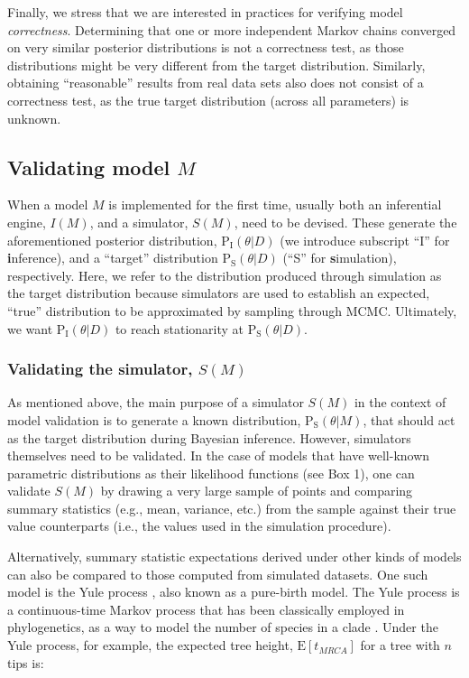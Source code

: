 \documentclass[oneside]{article}
\begin{document}
Finally, we stress that we are interested in practices for verifying model
\emph{correctness}.
Determining that one or more independent Markov chains converged on very
similar posterior distributions is not a correctness test, as those
distributions might be very different from the target distribution.
Similarly, obtaining ``reasonable'' results from real data sets also
does not consist of a correctness test, as the true target
distribution (across all parameters) is unknown.

\subsection*{Validating model $M$}

When a model $M$ is implemented for the first time, usually both an
inferential engine, $I(M)$, and a simulator, $S(M)$, need to be devised.
These generate the aforementioned posterior distribution,
$\text{P}_{\text{I}}(\theta|D)$ (we introduce subscript ``I'' for
\textbf{i}nference), and a ``target'' distribution $\text{P}_{\text{S}}(\theta|D)$ (``S''
for \textbf{s}imulation), respectively.
Here, we refer to the distribution produced through simulation as the
target distribution because simulators are used to establish an
expected, ``true'' distribution to be approximated by sampling through MCMC.
Ultimately, we want $\text{P}_{\text{I}}(\theta|D)$ to reach stationarity at
$\text{P}_{\text{S}}(\theta|D)$.

\subsubsection*{Validating the simulator, $S(M)$}\label{verify-correctness-of-simulator-implementation}

As mentioned above, the main purpose of a simulator $S(M)$ in the context of model
validation is to generate a known distribution,
$\text{P}_{\text{S}}(\theta|M)$, that should act as the target distribution during
Bayesian inference.
However, simulators themselves need to be validated.
In the case of models that have well-known parametric distributions as their
likelihood functions (see Box 1), one can validate $S(M)$ by
drawing a very large sample of points and comparing summary statistics
(e.g., mean, variance, etc.) from the sample against their true value counterparts (i.e., the
values used in the simulation procedure). 

Alternatively, summary statistic expectations derived under other kinds of models can also be compared
to those computed from simulated datasets.
One such model is the Yule process \citep{yule24}, also known as a pure-birth model.
The Yule process is a continuous-time Markov process that has been
classically employed in phylogenetics, as a way to model the number of
species in a clade \citep{yule24,aldous01}.
Under the Yule process, for example, the expected tree height,
$\text{E}[t_{MRCA}]$ for a tree with $n$ tips is:
\end{document}
